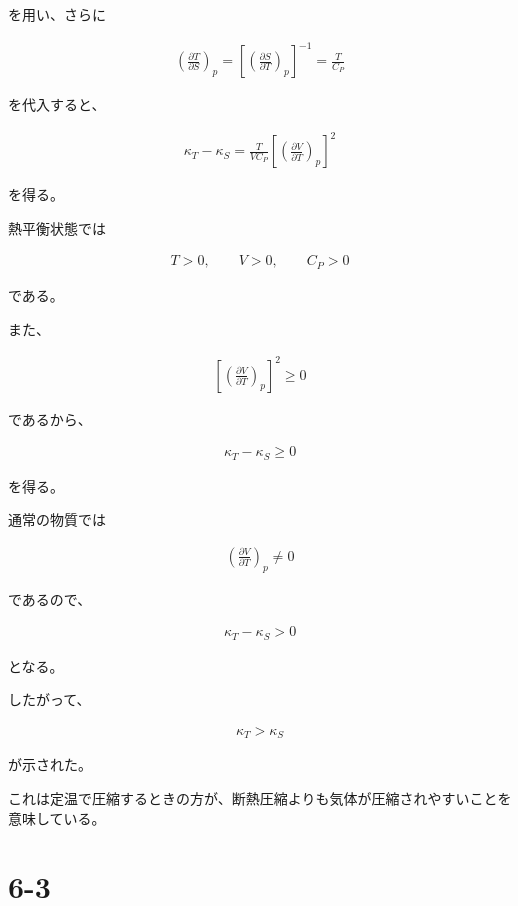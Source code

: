 \documentclass[platex,dvipdfmx,a4paper]{jsarticle}
\begin{document}
を用い、さらに

\begin{align*}
\left(
\frac{\partial T}{\partial S}
\right)_p
=
\left[
\left(
\frac{\partial S}{\partial T}
\right)_p
\right]^{-1}
=
\frac{T}{C_P}
\end{align*}

を代入すると、

\begin{align*}
\kappa_T-\kappa_S
=
\frac{T}{VC_P}
\left[
\left(
\frac{\partial V}{\partial T}
\right)_p
\right]^2
\end{align*}

を得る。

熱平衡状態では

\begin{align*}
T>0,
\qquad
V>0,
\qquad
C_P>0
\end{align*}

である。

また、

\begin{align*}
\left[
\left(
\frac{\partial V}{\partial T}
\right)_p
\right]^2
\ge 0
\end{align*}

であるから、

\begin{align*}
\kappa_T-\kappa_S
\ge 0
\end{align*}

を得る。

通常の物質では

\begin{align*}
\left(
\frac{\partial V}{\partial T}
\right)_p
\neq 0
\end{align*}

であるので、

\begin{align*}
\kappa_T-\kappa_S
>
0
\end{align*}

となる。

したがって、

\begin{align*}
\boxed{
\kappa_T>\kappa_S
}
\end{align*}

が示された。

これは定温で圧縮するときの方が、断熱圧縮よりも気体が圧縮されやすいことを意味している。
\section{6-3}
\end{document}
